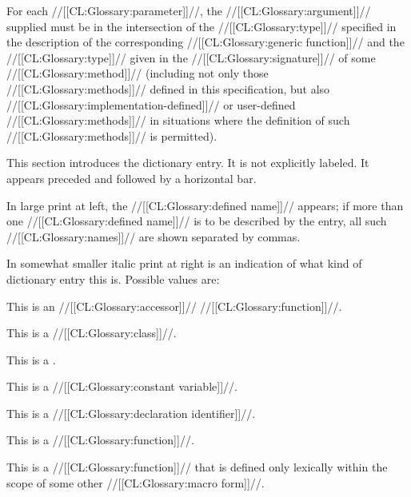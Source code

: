 For each //[[CL:Glossary:parameter]]//, the //[[CL:Glossary:argument]]// supplied must be in the intersection of the //[[CL:Glossary:type]]// specified in the description of the corresponding //[[CL:Glossary:generic function]]// and the //[[CL:Glossary:type]]// given in  the //[[CL:Glossary:signature]]// of some //[[CL:Glossary:method]]// (including not only those  //[[CL:Glossary:methods]]// defined in this specification, but also //[[CL:Glossary:implementation-defined]]// or user-defined //[[CL:Glossary:methods]]// in situations where the definition of such //[[CL:Glossary:methods]]// is permitted).

\endsubsubsection%


This section introduces the dictionary entry.  It is not explicitly labeled. It appears preceded and followed by a horizontal bar.

In large print at left, the //[[CL:Glossary:defined name]]// appears; if more than one //[[CL:Glossary:defined name]]// is to be described by the entry, all such //[[CL:Glossary:names]]//  are shown separated by commas.

In somewhat smaller italic print at right is an indication of what kind of dictionary entry this is.  Possible values are:

\beginlist


This is an //[[CL:Glossary:accessor]]// //[[CL:Glossary:function]]//.


This is a //[[CL:Glossary:class]]//.


This is a .


This is a //[[CL:Glossary:constant variable]]//.


This is a //[[CL:Glossary:declaration identifier]]//.


This is a //[[CL:Glossary:function]]//.


This is a //[[CL:Glossary:function]]// that is defined only lexically within the scope of some other //[[CL:Glossary:macro form]]//.

